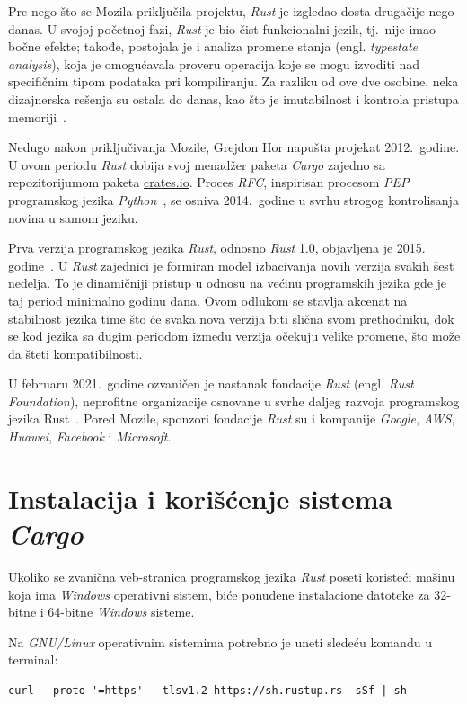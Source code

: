 \documentclass[12pt,oneside]{memoir}
\begin{document}
Pre nego što se Mozila priključila projektu, \emph{Rust} je izgledao dosta
drugačije nego danas. U svojoj početnoj fazi, \emph{Rust} je bio čist funkcionalni jezik,
tj.\ nije imao bočne efekte; takođe, postojala je i analiza promene stanja
(engl. \emph{typestate analysis}), koja je omogućavala proveru operacija
koje se mogu izvoditi nad specifičnim tipom podataka pri kompiliranju. Za
razliku od ove dve osobine, neka dizajnerska rešenja su ostala do danas, kao
što je imutabilnost i kontrola pristupa memoriji~\cite{history_rust}.

Nedugo nakon priključivanja Mozile, Grejdon Hor napušta projekat
2012.\ godine. U ovom periodu \emph{Rust} dobija svoj menadžer
paketa \emph{Cargo} zajedno sa repozitorijumom paketa \url{crates.io}.
Proces \emph{RFC}, inspirisan procesom \emph{PEP} programskog jezika
\emph{Python}~\cite{python_pep}, se
osniva 2014.\ godine u svrhu strogog kontrolisanja novina u samom jeziku.

Prva verzija programskog jezika \emph{Rust}, odnosno \emph{Rust} 1.0, objavljena je 2015.
godine~\cite{stable_rust}. U \emph{Rust} zajednici je formiran model izbacivanja novih
verzija svakih šest nedelja. To je dinamičniji pristup
u odnosu na većinu programskih jezika gde je taj period minimalno godinu dana.
Ovom odlukom se stavlja akcenat na stabilnost jezika time što će svaka nova
verzija biti slična svom prethodniku, dok se kod jezika sa dugim periodom
između verzija očekuju velike promene, što može da šteti kompatibilnosti.

U februaru 2021.\ godine ozvaničen je nastanak fondacije \emph{Rust} (engl.
\textit{Rust Foundation}), neprofitne organizacije osnovane u svrhe daljeg razvoja programskog
jezika Rust~\cite{rust_foundation}. Pored Mozile, sponzori fondacije \emph{Rust} su i kompanije
\emph{Google}, \emph{AWS}, \emph{Huawei}, \emph{Facebook} i \emph{Microsoft}.

\section{Instalacija i korišćenje sistema \emph{Cargo}}
Ukoliko se zvanična veb-stranica programskog jezika \emph{Rust} poseti koristeći
mašinu koja ima \emph{Windows} operativni sistem, biće ponuđene
instalacione datoteke za 32-bitne i 64-bitne \emph{Windows} sisteme.

Na \emph{GNU/Linux} operativnim sistemima potrebno je uneti sledeću
komandu u terminal:

\begin{lstlisting}[language={}, style=text]
curl --proto '=https' --tlsv1.2 https://sh.rustup.rs -sSf | sh
\end{lstlisting}
\end{document}

